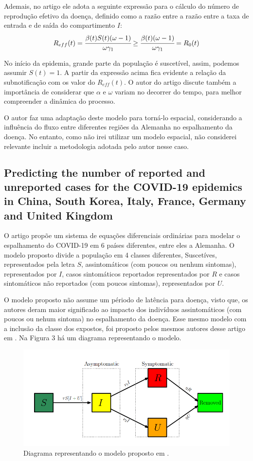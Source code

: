 \documentclass[12pt]{article}
\begin{document}
Ademais, no artigo ele adota a seguinte expressão para o cálculo do número de reprodução efetivo da doença, definido como a razão entre a razão entre a taxa de entrada e de saída do compartimento $I$:
$$R_{eff}(t) = \cfrac{\beta(t)S(t) (\omega -1)}{\omega \gamma_1} \geq \cfrac{\beta(t) (\omega -1)}{\omega \gamma_1} = R_0(t)$$

No início da epidemia, grande parte da população é suscetível, assim, podemos assumir $S(t) =1$. A partir da expressão acima fica evidente a relação da subnotificação com os valor do $R_{eff}(t)$. O autor do artigo discute também a importância de considerar que $\alpha$ e $\omega$ variam no decorrer do tempo, para melhor compreender a dinâmica do processo.


O autor faz uma adaptação deste modelo para torná-lo espacial, considerando a influência do fluxo entre diferentes regiões da Alemanha no espalhamento da doença. No entanto, como não irei utilizar um modelo espacial, não considerei relevante incluir a metodologia adotada pelo autor nesse caso.

\subsection{Predicting the number of reported and unreported cases for the COVID-19 epidemics in China, South Korea, Italy, France, Germany and United Kingdom}

O artigo \cite{liu2020predicting} propõe um sistema de equações diferenciais ordinárias para modelar o espalhamento do COVID-19 em 6 países diferentes, entre eles a Alemanha. O modelo proposto divide a população em 4 classes diferentes, Suscetíves, representados pela letra $S$, assintomáticos (com poucos ou nenhum sintomas), representados por $I$, casos sintomáticos reportados representados por $R$ e casos sintomáticos não reportados (com poucos sintomas), representados por $U$. 

O modelo proposto não assume um périodo de latência para doença, visto que, os autores deram maior significado ao impacto dos indivíduos assintomáticos (com poucos ou nehum sintoma) no espalhamento da doença. Esse mesmo modelo com a inclusão da classe dos expostos, foi proposto pelos mesmos autores desse artigo em \cite{liu2020covid}. Na Figura 3 há um diagrama representando o modelo.
\begin{figure}[h]
\begin{center}
    \includegraphics[scale = 0.6]{diag-Liu.png}
    \caption{Diagrama representando o modelo proposto em \cite{liu2020predicting}.}
\end{center}
\end{figure}
\end{document}
